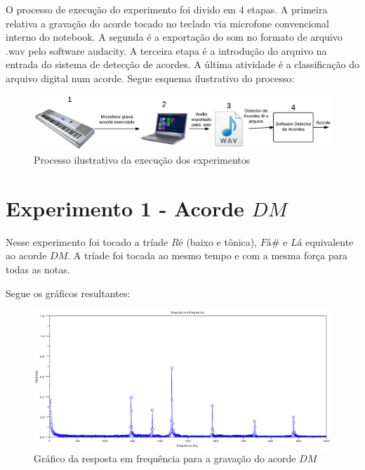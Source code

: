 O processo de execução do experimento foi divido em 4 etapas. A primeira relativa a gravação do acorde tocado no teclado via microfone convencional interno do notebook. A segunda é a exportação do som no formato de arquivo .wav pelo software audacity. A terceira etapa é a introdução do arquivo na entrada do sistema de detecção de acordes. A última atividade é a classificação do arquivo digital num acorde. Segue esquema ilustrativo do processo:

\begin{figure}[h]
	\centering
		\includegraphics[keepaspectratio=true,scale=0.35]{figuras/processo_experimento.eps}
	\caption{Processo ilustrativo da execução dos experimentos}
\end{figure}

\newpage
\section{Experimento 1 - Acorde $DM$}
\label{sec:experimento1}

Nesse experimento foi tocado a tríade $Ré$ (baixo e tônica), $Fá\#$ e $Lá$ equivalente ao acorde $DM$. A tríade foi tocada ao mesmo tempo e com a mesma força para todas as notas.

Segue os gráficos resultantes:

\begin{figure}[h]
	\centering
		\includegraphics[keepaspectratio=true,scale=0.49]{figuras/Dm/fft_DM.eps}
	\caption{Gráfico da resposta em frequência para a gravação do acorde $DM$}
\end{figure}

